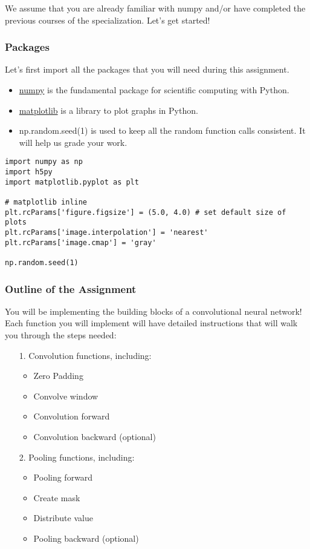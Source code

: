 {We assume that you are already familiar with numpy and/or have completed the previous courses of the specialization. Let's get started!


\subsubsection{Packages}

Let's first import all the packages that you will need during this assignment. 
\begin{itemize}
\item \href{www.numpy.org}{numpy} is the fundamental package for scientific computing with Python.
\item \href{http://matplotlib.org}{matplotlib} is a library to plot graphs in Python.
\item np.random.seed(1) is used to keep all the random function calls consistent. It will help us grade your work.
\end{itemize}

\begin{verbatim}
import numpy as np
import h5py
import matplotlib.pyplot as plt

# matplotlib inline
plt.rcParams['figure.figsize'] = (5.0, 4.0) # set default size of plots
plt.rcParams['image.interpolation'] = 'nearest'
plt.rcParams['image.cmap'] = 'gray'

np.random.seed(1)
\end{verbatim}


\subsubsection{Outline of the Assignment}

You will be implementing the building blocks of a convolutional neural network! Each function you will implement will have detailed instructions that will walk you through the steps needed:
\begin{itemize}
\item[1.] Convolution functions, including:
\begin{itemize}
\item Zero Padding
\item Convolve window
\item Convolution forward
\item Convolution backward (optional)
\end{itemize}
\item[2.] Pooling functions, including:
\begin{itemize}
\item Pooling forward
\item Create mask
\item Distribute value
\item Pooling backward (optional)
\end{itemize}
\end{itemize}

}

